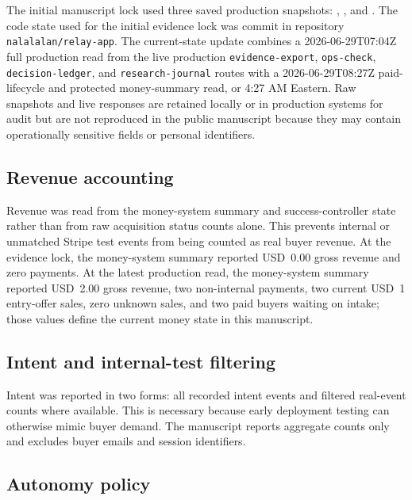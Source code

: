 \documentclass[12pt,letterpaper]{article}
\begin{document}
The initial manuscript lock used three saved production snapshots: \texttt{}, \texttt{}, and \texttt{}. The code state used for the initial evidence lock was commit \texttt{} in repository \texttt{nalalalan/relay-app}. The current-state update combines a 2026-06-29T07:04Z full production read from the live production \texttt{evidence-export}, \texttt{ops-check}, \texttt{decision-ledger}, and \texttt{research-journal} routes with a 2026-06-29T08:27Z paid-lifecycle and protected money-summary read, or 4:27 AM Eastern. Raw snapshots and live responses are retained locally or in production systems for audit but are not reproduced in the public manuscript because they may contain operationally sensitive fields or personal identifiers.

\subsection{Revenue accounting}

Revenue was read from the money-system summary and success-controller state rather than from raw acquisition status counts alone. This prevents internal or unmatched Stripe test events from being counted as real buyer revenue. At the evidence lock, the money-system summary reported USD~0.00 gross revenue and zero payments. At the latest production read, the money-system summary reported USD~2.00 gross revenue, two non-internal payments, two current USD~1 entry-offer sales, zero unknown sales, and two paid buyers waiting on intake; those values define the current money state in this manuscript.

\subsection{Intent and internal-test filtering}

Intent was reported in two forms: all recorded intent events and filtered real-event counts where available. This is necessary because early deployment testing can otherwise mimic buyer demand. The manuscript reports aggregate counts only and excludes buyer emails and session identifiers.

\subsection{Autonomy policy}
\end{document}
